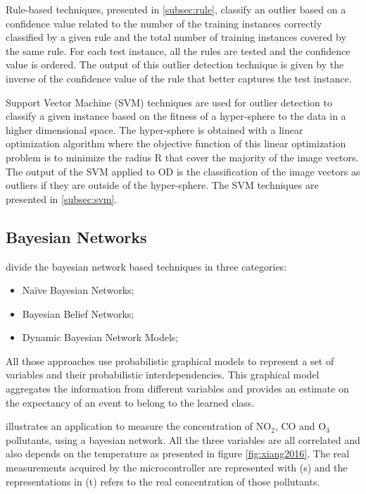 \vspace{0.5em}

Rule-based techniques, presented in \ref{subsec:rule}, classify an outlier based on a confidence value related to the number of the training instances correctly classified by a given rule and the total number of training instances covered by the same rule. For each test instance, all the rules are tested and the confidence value is ordered. The output of this outlier detection technique is given by the inverse of the confidence value of the rule that better captures the test instance.

\vspace{0.5em}

Support Vector Machine (SVM) techniques are used for outlier detection to classify a given instance based on the fitness of a hyper-sphere to the data in a higher dimensional space. 
The hyper-sphere is obtained with a linear optimization algorithm where the objective function of this linear optimization problem is to minimize the radius R that cover the majority of the image vectors. The output of the SVM applied to OD is the classification of the image vectors as outliers if they are outside of the hyper-sphere. The SVM techniques are presented in \ref{subsec:svm}.

\newpage

\subsection{Bayesian Networks}
\label{subsec:bay}
\cite{gen:zhang:2010} divide the bayesian network based techniques in three categories: 

\begin{itemize}
	\setlength\itemsep{-0.5em}
	\item Na\"{i}ve Bayesian Networks;
	\item Bayesian Belief Networks;
	\item Dynamic Bayesian Network Models;	
\end{itemize}

All those approaches use probabilistic graphical models to represent a set of variables and their probabilistic interdependencies. 
This graphical model aggregates the information from different variables and provides an estimate on the expectancy of an event to belong to the learned class.

\cite{class:xiang:2016} illustrates an application to measure the concentration of NO$_2$, CO and O$_3$ pollutants, using a bayesian network. All the three variables are all correlated and also depends on the temperature as presented in figure \ref{fig:xiang2016}. The real measurements acquired by the microcontroller are represented with (s) and the representations in (t) refers to the real concentration of those pollutants.

